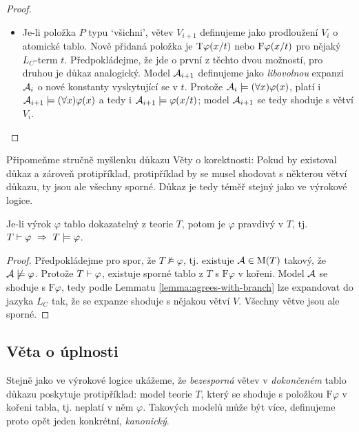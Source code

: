 \begin{proof}
\begin{itemize}
\begin{itemize}
            \item Je-li položka $P$ typu `všichni', větev $V_{i+1}$ definujeme jako prodloužení $V_i$ o atomické tablo. Nově přidaná položka je $\mathrm{T}\varphi(x/t)$ nebo $\mathrm{F}\varphi(x/t)$ pro nějaký $L_C$-term $t$. Předpokládejme, že jde o první z těchto dvou možností, pro druhou je důkaz analogický. 
            Model $\mathcal{A}_{i+1}$ definujeme jako \emph{libovolnou} expanzi $\mathcal{A}_i$ o nové konstanty vyskytující se v $t$.    
            Protože $\mathcal{A}_i\models(\forall x)\varphi(x)$, platí i $\mathcal{A}_{i+1}\models(\forall x)\varphi(x)$ a tedy i $\mathcal{A}_{i+1}\models\varphi(x/t)$; model $\mathcal{A}_{i+1}$ se tedy shoduje s větví $V_i$.
        \end{itemize}       
    \end{itemize}
\end{proof}

Připomeňme stručně myšlenku důkazu Věty o korektnosti: Pokud by existoval důkaz a zároveň protipříklad, protipříklad by se musel shodovat s některou větví důkazu, ty jsou ale všechny sporné. Důkaz je tedy téměř stejný jako ve výrokové logice.

\begin{theorem}[O korektnosti]
Je-li výrok $\varphi$ tablo dokazatelný z teorie $T$, potom je $\varphi$ pravdivý v $T$, tj. $T\proves\varphi\ \Rightarrow\ T\models\varphi$.    
\end{theorem}

\begin{proof}
Předpokládejme pro spor, že $T\not\models\varphi$, tj. existuje $\mathcal{A}\in\operatorname{M}(T)$ takový, že $\mathcal{A}\not\models\varphi$. Protože $T\vdash\varphi$,  existuje sporné tablo z $T$ s $\mathrm{F}\varphi$ v kořeni. Model $\mathcal{A}$ se shoduje s $\mathrm{F}\varphi$, tedy podle Lemmatu \ref{lemma:agrees-with-branch} lze expandovat do jazyka $L_C$ tak, že se expanze shoduje s nějakou větví $V$. Všechny větve jsou ale sporné.
\end{proof}

\subsection{Věta o úplnosti}

Stejně jako ve výrokové logice ukážeme, že \emph{bezesporná} větev v \emph{dokončeném} tablo důkazu poskytuje protipříklad: model teorie $T$, který se shoduje s položkou $\mathrm{F}\varphi$ v kořeni tabla, tj. neplatí v něm $\varphi$. Takových modelů může být více, definujeme proto opět jeden konkrétní, \emph{kanonický}.

